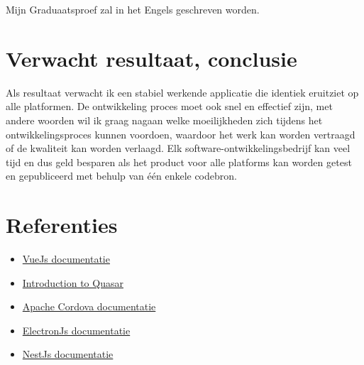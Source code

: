 Mijn Graduaatsproef zal in het Engels geschreven worden.


\section{Verwacht resultaat, conclusie}%
\label{sec:verwachte_resultaten}


Als resultaat verwacht ik een stabiel werkende applicatie die identiek eruitziet op alle platformen. De ontwikkeling proces moet ook snel en effectief zijn, met andere woorden wil ik graag nagaan welke moeilijkheden zich tijdens het ontwikkelingsproces kunnen voordoen, waardoor het werk kan worden vertraagd of de kwaliteit kan worden verlaagd. Elk software-ontwikkelingsbedrijf kan veel tijd en dus geld besparen als het product voor alle platforms kan worden getest en gepubliceerd met behulp van één enkele codebron.


\section{Referenties}

\begin{itemize}
  \item \href{https://vuejs.org/guide/}{VueJs documentatie}
  \item \href{https://quasar.dev/introduction-to-quasar}{Introduction to Quasar}
  \item \href{https://cordova.apache.org/docs}{Apache Cordova documentatie}
  \item \href{https://www.electronjs.org/}{ElectronJs documentatie}
  \item \href{https://docs.nestjs.com/}{NestJs documentatie}
\end{itemize}


